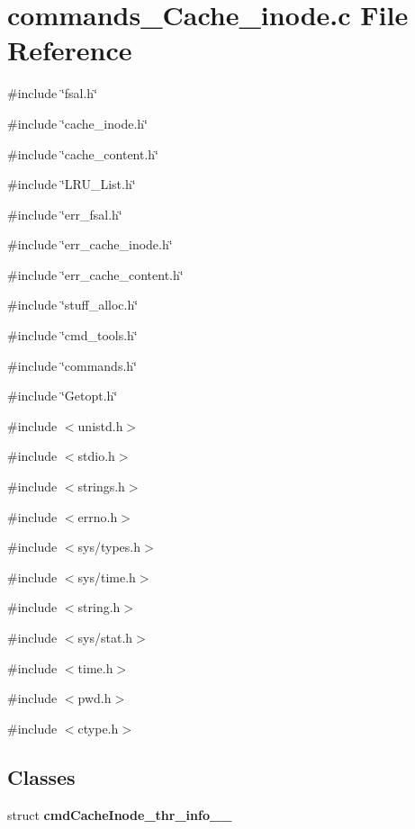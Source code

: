 \section{commands\_\-Cache\_\-inode.c File Reference}
\label{commands__Cache__inode_8c}
{\ttfamily \#include \char`\"{}fsal.h\char`\"{}}\par
{\ttfamily \#include \char`\"{}cache\_\-inode.h\char`\"{}}\par
{\ttfamily \#include \char`\"{}cache\_\-content.h\char`\"{}}\par
{\ttfamily \#include \char`\"{}LRU\_\-List.h\char`\"{}}\par
{\ttfamily \#include \char`\"{}err\_\-fsal.h\char`\"{}}\par
{\ttfamily \#include \char`\"{}err\_\-cache\_\-inode.h\char`\"{}}\par
{\ttfamily \#include \char`\"{}err\_\-cache\_\-content.h\char`\"{}}\par
{\ttfamily \#include \char`\"{}stuff\_\-alloc.h\char`\"{}}\par
{\ttfamily \#include \char`\"{}cmd\_\-tools.h\char`\"{}}\par
{\ttfamily \#include \char`\"{}commands.h\char`\"{}}\par
{\ttfamily \#include \char`\"{}Getopt.h\char`\"{}}\par
{\ttfamily \#include $<$unistd.h$>$}\par
{\ttfamily \#include $<$stdio.h$>$}\par
{\ttfamily \#include $<$strings.h$>$}\par
{\ttfamily \#include $<$errno.h$>$}\par
{\ttfamily \#include $<$sys/types.h$>$}\par
{\ttfamily \#include $<$sys/time.h$>$}\par
{\ttfamily \#include $<$string.h$>$}\par
{\ttfamily \#include $<$sys/stat.h$>$}\par
{\ttfamily \#include $<$time.h$>$}\par
{\ttfamily \#include $<$pwd.h$>$}\par
{\ttfamily \#include $<$ctype.h$>$}\par
\subsection*{Classes}
\begin{DoxyCompactItemize}
\item 
struct {\bf cmdCacheInode\_\-thr\_\-info\_\-\_\-}
\end{DoxyCompactItemize}
